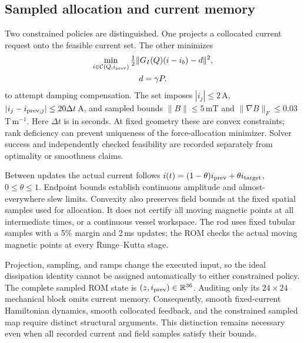 \subsection{Sampled allocation and current memory}
Two constrained policies are distinguished. One projects a collocated current request onto the feasible current set. The other minimizes
\begin{equation}
\begin{gathered}
 \min_{i\in\mathcal C(Q,i_{\rm prev})}
 \tfrac12\|G_I(Q)(i-i_b)-d\|^2,\\
 d=\gamma P.
\end{gathered}
 \label{eq:force-allocation}
\end{equation}
to attempt damping compensation. The set imposes $|i_j|\leq2$\,A,
$|i_j-i_{{\rm prev},j}|\leq20\Delta t$\,A, and sampled bounds
$\|B\|\leq5$\,mT and $\|\nabla B\|_F\leq0.03$\,T\,m$^{-1}$. Here $\Delta t$ is in seconds. At fixed geometry these are convex constraints; rank deficiency can prevent uniqueness of the force-allocation minimizer. Solver success and independently checked feasibility are recorded separately from optimality or smoothness claims.

Between updates the actual current follows
$i(t)=(1-\theta)i_{\rm prev}+\theta i_{\rm target}$, $0\leq\theta\leq1$.
Endpoint bounds establish continuous amplitude and almost-everywhere slew limits. Convexity also preserves field bounds at the fixed spatial samples used for allocation. It does not certify all moving magnetic points at all intermediate times, or a continuous vessel workspace. The rod uses fixed tubular samples with a 5\% margin and 2\,ms updates; the ROM checks the actual moving magnetic points at every Runge--Kutta stage.

Projection, sampling, and ramps change the executed input, so the ideal dissipation identity cannot be assigned automatically to either constrained policy. The complete sampled ROM state is $(z,i_{\rm prev})\in\mathbb R^{36}$. Auditing only its $24\times24$ mechanical block omits current memory. Consequently, smooth fixed-current Hamiltonian dynamics, smooth collocated feedback, and the constrained sampled map require distinct structural arguments. This distinction remains necessary even when all recorded current and field samples satisfy their bounds.
